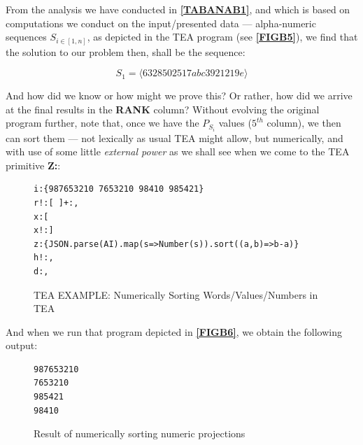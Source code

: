 \documentclass[a4paper, 18pt]{book} %
\begin{document}
From the analysis we have conducted in \textbf{\autoref{TABANAB1}}, and which is based on computations we conduct on the input/presented data --- alpha-numeric sequences $S_{i\in [1,n]}$, as depicted in the TEA program (see  \textbf{\autoref{FIGB5}}), we find that the solution to our problem then, shall be the sequence:

\begin{equation}
\label{EQB1}
S_1 = \langle 63 285 02517 abc3921 219e \rangle
\end{equation}

And how did we know or how might we prove this? Or rather, how did we arrive at the final results in the \textbf{RANK} column? Without evolving the original program further, note that, once we have the $P_{S_i}$ values ($5^{th}$ column), we then can sort them --- not lexically as usual TEA might allow, but numerically, and with use of some little \textit{external power} as we shall see when we come to the TEA primitive \textbf{Z:}:



 \begin{figure}[H]
 \Large
  \centering
  \begin{tcolorbox}[teaterminalstyle, title=TEA Program: sort in descending order numbers from input sequence]
  \begin{lstlisting}[language=TEA]
i:{987653210 7653210 98410 985421} 
r!:[ ]+:,
x:[
x!:]
z:{JSON.parse(AI).map(s=>Number(s)).sort((a,b)=>b-a)}
h!:,
d:,
   \end{lstlisting}
  \end{tcolorbox}
  \caption{TEA EXAMPLE: Numerically Sorting Words/Values/Numbers in TEA}
  \label{FIGB6}
\end{figure}


And when we run that program depicted in \textbf{\autoref{FIGB6}}, we obtain the following output:


\begin{figure}[H]
  \centering
  \begin{tcolorbox}[myterminalstyle, title=TEA Output from \textbf{\autoref{FIGB6}}]
  \begin{lstlisting}
987653210
7653210
985421
98410
  \end{lstlisting}
  \end{tcolorbox}
  \caption{Result of numerically sorting numeric projections}
\end{figure}
\end{document}

